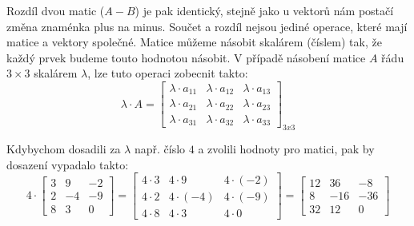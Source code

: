 \documentclass[12pt]{article}
\begin{document}
Rozdíl dvou matic ($A - B$) je pak identický, stejně jako u vektorů nám postačí změna znaménka plus na minus. Součet a rozdíl nejsou jediné operace, které mají matice a vektory společné. Matice můžeme násobit skalárem (číslem) tak, že každý prvek budeme touto hodnotou násobit. V případě násobení matice $A$ řádu $3 \times 3$ skalárem $\lambda$, lze tuto operaci zobecnit takto:
\begin{equation}
    \lambda \cdot A = \begin{bmatrix}
        \lambda \cdot a_{11} & \lambda \cdot a_{12} & \lambda \cdot a_{13} \\
        \lambda \cdot a_{21} & \lambda \cdot a_{22} & \lambda \cdot a_{23} \\
        \lambda \cdot a_{31} & \lambda \cdot a_{32} & \lambda \cdot a_{33}
    \end{bmatrix}_{3x3}
\end{equation}

Kdybychom dosadili za $\lambda$ např. číslo $4$ a zvolili hodnoty pro matici, pak by dosazení vypadalo takto:
\begin{equation}
    4 \cdot \begin{bmatrix}
        3 & 9 & -2 \\
        2 & -4 & -9 \\
        8 & 3 & 0
    \end{bmatrix} = \begin{bmatrix}
        4 \cdot 3 & 4 \cdot 9 & 4 \cdot  (-2) \\
        4 \cdot 2 & 4 \cdot (-4) & 4 \cdot (-9) \\
        4 \cdot 8 & 4 \cdot 3 & 4 \cdot 0
    \end{bmatrix} = \begin{bmatrix}
        12 & 36 & -8 \\
        8 & -16 & -36 \\
        32 & 12 & 0
    \end{bmatrix}
\end{equation}
\end{document}
